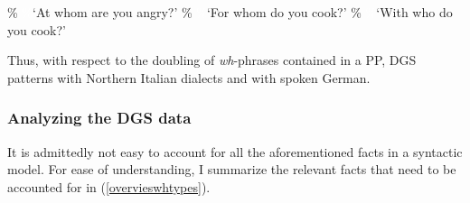 \begin{exe}
\ex\label{doublingphrases}
\begin{xlist} 
\ex \%
%
\glt \textcolor{white}{\%}`At whom are you angry?' \label{ex:doublingphrasesa} 
\ex \%
%
\glt \textcolor{white}{\%}`For whom do you cook?' \label{ex:doublingphrasesb} 
\ex \%
%
\glt \textcolor{white}{\%}`With who do you cook?' \label{ex:doublingphrasesc} 
\end{xlist}
\end{exe}

\noindent Thus, with respect to the doubling of \textit{wh}-phrases contained in a PP, DGS patterns with Northern Italian dialects and with spoken German. 




\subsubsection{Analyzing the DGS data}

\noindent It is admittedly not easy to account for all the aforementioned facts in a syntactic model. For ease of understanding, I summarize the relevant facts that need to be accounted for in (\ref{overvieswhtypes}).

